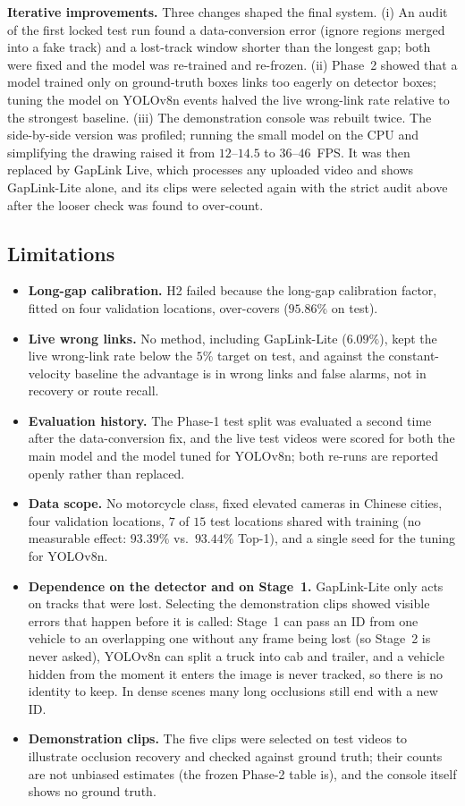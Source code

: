 \textbf{Iterative improvements.} Three changes shaped the final system. (i) An audit of the first locked test run found a data-conversion error (ignore regions merged into a fake track) and a lost-track window shorter than the longest gap; both were fixed and the model was re-trained and re-frozen. (ii) Phase~2 showed that a model trained only on ground-truth boxes links too eagerly on detector boxes; tuning the model on YOLOv8n events halved the live wrong-link rate relative to the strongest baseline. (iii) The demonstration console was rebuilt twice. The side-by-side version was profiled; running the small model on the CPU and simplifying the drawing raised it from $12$--$14.5$ to $36$--$46$~FPS. It was then replaced by GapLink Live, which processes any uploaded video and shows GapLink-Lite alone, and its clips were selected again with the strict audit above after the looser check was found to over-count.

\subsection{Limitations}
\label{sec:limitations}

\begin{itemize}
    \item \textbf{Long-gap calibration.} H2 failed because the long-gap calibration factor, fitted on four validation locations, over-covers ($95.86\%$ on test).
    \item \textbf{Live wrong links.} No method, including GapLink-Lite ($6.09\%$), kept the live wrong-link rate below the $5\%$ target on test, and against the constant-velocity baseline the advantage is in wrong links and false alarms, not in recovery or route recall.
    \item \textbf{Evaluation history.} The Phase-1 test split was evaluated a second time after the data-conversion fix, and the live test videos were scored for both the main model and the model tuned for YOLOv8n; both re-runs are reported openly rather than replaced.
    \item \textbf{Data scope.} No motorcycle class, fixed elevated cameras in Chinese cities, four validation locations, $7$ of $15$ test locations shared with training (no measurable effect: $93.39\%$ vs.\ $93.44\%$ Top-1), and a single seed for the tuning for YOLOv8n.
    \item \textbf{Dependence on the detector and on Stage~1.} GapLink-Lite only acts on tracks that were lost. Selecting the demonstration clips showed visible errors that happen before it is called: Stage~1 can pass an ID from one vehicle to an overlapping one without any frame being lost (so Stage~2 is never asked), YOLOv8n can split a truck into cab and trailer, and a vehicle hidden from the moment it enters the image is never tracked, so there is no identity to keep. In dense scenes many long occlusions still end with a new ID.
    \item \textbf{Demonstration clips.} The five clips were selected on test videos to illustrate occlusion recovery and checked against ground truth; their counts are not unbiased estimates (the frozen Phase-2 table is), and the console itself shows no ground truth.
\end{itemize}
